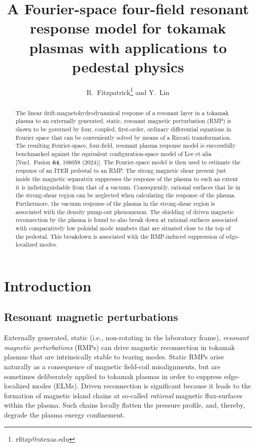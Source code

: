 \documentclass[12pt,prb,aps]{revtex4-1}
\begin{document}
\title{A Fourier-space four-field resonant response model for tokamak plasmas with applications to pedestal physics}

\author{R.~Fitzpatrick\footnote{rfitzp@utexas.edu} and Y.~Lin}

\begin{abstract}
The linear drift-magnetohydrodynamical  response of a resonant layer in a tokamak plasma to an externally generated, static,  resonant magnetic
perturbation (RMP) is shown to be governed by four, coupled, first-order, ordinary differential equations in Fourier space 
that can be  conveniently solved by means of a Riccati transformation. The resulting Fourier-space, four-field, resonant plasma response model is 
successfully benchmarked against the equivalent configuration-space model of Lee et alia  [Nucl.\ Fusion {\bf 64}, 106058 (2024)].  The Fourier-space model is then used to
estimate the response of an ITER pedestal to an RMP.  The strong magnetic shear present just inside the magnetic
separatrix suppresses the response of the plasma  to such an extent it is indistinguishable from that
of a vacuum. Consequently, rational surfaces that lie in the strong-shear region can be neglected when calculating the response of the plasma.  Furthermore, the vacuum response of the plasma in the strong-shear region is associated with the density pump-out phenomenon. The shielding of driven magnetic reconnection  by the plasma is found to also break down at rational surfaces associated with comparatively low
poloidal mode numbers that are situated close to the top of the pedestal. This breakdown is associated with the RMP-induced suppression of edge-localized modes.  

\end{abstract}

\maketitle

\section{Introduction}
\subsection{Resonant magnetic perturbations}
Externally generated, static (i.e., non-rotating in the laboratory frame), {\em resonant magnetic perturbations}\/ (RMPs) can drive magnetic reconnection in tokamak plasmas that
are intrinsically stable to tearing modes. \cite{sco,compass,fish,rf1993,rf1998} Static RMPs arise naturally as a consequence  of magnetic
field-coil misalignments,\cite{error} but are sometimes deliberately applied to tokamak plasmas in order to suppress edge-localized modes (ELMs).\cite{elmx}
Driven reconnection is significant because it leads to the formation of magnetic island chains at so-called {\em rational}\/ magnetic flux-surfaces within the plasma. \cite{boz} Such chains locally flatten the pressure profile, and, thereby, degrade the plasma energy confinement.\cite{chang}
\end{document}
